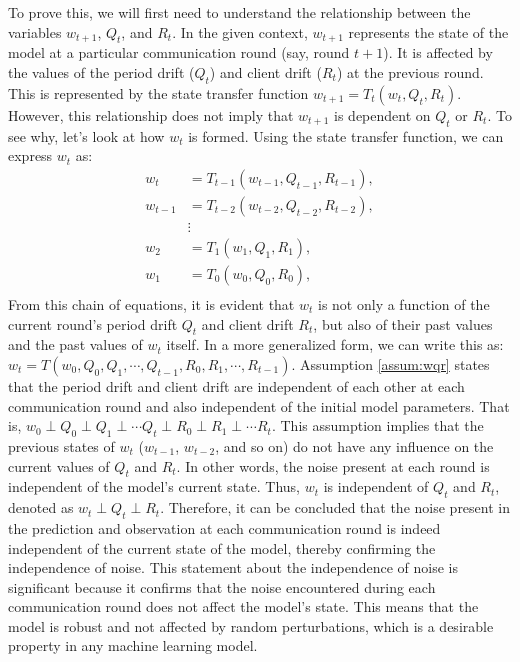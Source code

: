 To prove this, we will first need to understand the relationship between the variables $w_{t+1}$, $Q_t$, and $R_t$.
In the given context, $w_{t+1}$ represents the state of the model at a particular communication round (say, round $t+1$). It is affected by the values of the period drift ($Q_t$) and client drift ($R_t$) at the previous round. This is represented by the state transfer function $w_{t+1}=T_t(w_t,Q_t,R_t)$.
However, this relationship does not imply that $w_{t+1}$ is dependent on $Q_t$ or $R_t$. To see why, let's look at how $w_t$ is formed. Using the state transfer function, we can express $w_t$ as:
\begin{equation}
\begin{aligned}
w_{t}&=T_{t-1}(w_{t-1},Q_{t-1},R_{t-1}),\\
w_{t-1}&=T_{t-2}(w_{t-2},Q_{t-2},R_{t-2}),\\
&\vdots \\
w_{2}&=T_{1}(w_{1},Q_{1},R_{1}),\\
w_{1}&=T_{0}(w_0,Q_{0},R_{0}),\\
\end{aligned}
\end{equation}
From this chain of equations, it is evident that $w_t$ is not only a function of the current round's period drift $Q_t$ and client drift $R_t$, but also of their past values and the past values of $w_t$ itself. In a more generalized form, we can write this as: $w_{t}=T(w_0,Q_0,Q_1,\cdots,Q_{t-1},R_0,R_1,\cdots,R_{t-1})$. Assumption \ref{assum:wqr} states that the period drift and client drift are independent of each other at each communication round and also independent of the initial model parameters. That is, $w_0 \perp Q_0 \perp Q_1 \perp \cdots Q_t \perp R_0 \perp R_1 \perp \cdots R_t$.
This assumption implies that the previous states of $w_t$ ($w_{t-1}$, $w_{t-2}$, and so on) do not have any influence on the current values of $Q_t$ and $R_t$. In other words, the noise present at each round is independent of the model's current state. Thus, $w_t$ is independent of $Q_t$ and $R_t$, denoted as $w_t\perp Q_t\perp R_t$.
Therefore, it can be concluded that the noise present in the prediction and observation at each communication round is indeed independent of the current state of the model, thereby confirming the independence of noise.
This statement about the independence of noise is significant because it confirms that the noise encountered during each communication round does not affect the model's state. This means that the model is robust and not affected by random perturbations, which is a desirable property in any machine learning model.

